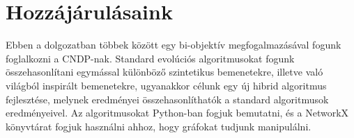 \section{Hozzájárulásaink}\label{sec:HOZZAJARULASAINK}

Ebben a dolgozatban többek között egy bi-objektív megfogalmazásával fogunk foglalkozni a CNDP-nak.
Standard evolúciós algoritmusokat fogunk összehasonlítani egymással különböző szintetikus bemenetekre, illetve való világból inspirált bemenetekre,
ugyanakkor célunk egy új hibrid algoritmus fejlesztése, melynek eredményei összehasonlíthatók a standard algoritmusok eredményeivel.
Az algoritmusokat Python-ban fogjuk bemutatni, és a NetworkX könyvtárat \cite{hagberg2008exploring} fogjuk használni ahhoz, hogy gráfokat tudjunk manipulálni.
